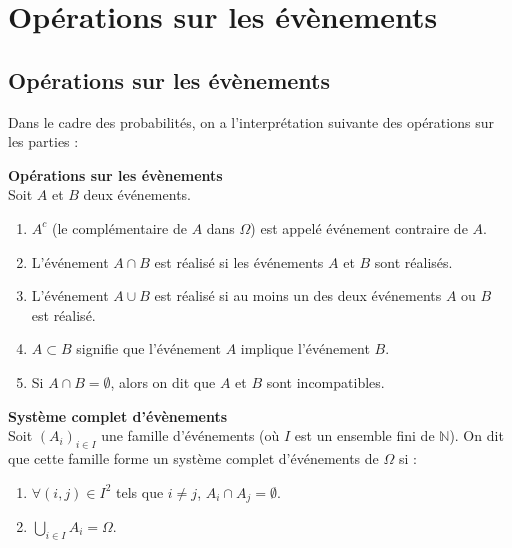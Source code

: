 \documentclass[../PolyS4.tex]{subfiles}
\begin{document}
\section{Opérations sur les évènements}

\subsection{Opérations sur les évènements}
Dans le cadre des probabilités, on a l'interprétation suivante des opérations sur les parties : 

\begin{Def} \textbf{Opérations sur les évènements}\\

Soit $A$ et $B$ deux événements.
\begin{enumerate}
    \item $A^c$ (le complémentaire de $A$ dans $\Omega$) est appelé événement contraire de $A$.
    \item L'événement $A \cap B$ est réalisé si les événements $A$ et $B$ sont réalisés.
    \item L'événement $A \cup B$ est réalisé si au moins un des deux événements $A$ ou $B$ est réalisé.
    \item $A \subset B$ signifie que l'événement $A$ implique l'événement $B$.
    \item Si $A \cap B = \emptyset$, alors on dit que $A$ et $B$ sont incompatibles.\\
\end{enumerate}
\end{Def}

\begin{Def}\textbf{Système complet d'évènements}\\

Soit $(A_i)_{i \in I}$ une famille d'événements (où $I$ est un ensemble fini de $\mathbb{N}$). On dit que cette famille forme un système complet d'événements de $\Omega$ si :
\begin{enumerate}
    \item $\forall(i, j) \in I^2$ tels que $i \neq j$, $A_i \cap A_j = \emptyset$.
    \item $\bigcup_{i \in I} A_i = \Omega$.\\
\end{enumerate}
\end{Def}
\end{document}
